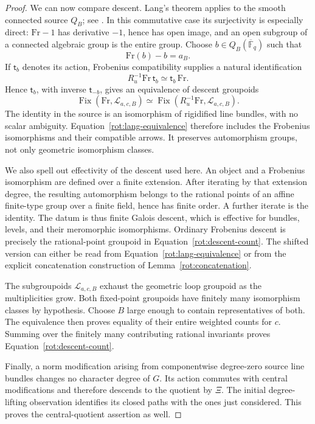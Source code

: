 \begin{proof}
We can now compare descent.  Lang's theorem applies to the smooth
connected source $Q_B$; see \cite[Theorem~1 and its corollary]{Lang}.  In this
commutative case its surjectivity is especially direct:
$\mathrm{Fr}-1$ has derivative $-1$, hence has open image, and an open
subgroup of a connected algebraic group is the entire group.  Choose
$b\in Q_B(\overline{\mathbb F}_q)$ such that
\[
 \mathrm{Fr}(b)-b=a_B.
\]
If $\mathsf t_b$ denotes its action, Frobenius compatibility supplies
a natural identification
\[
 R_u^{-1}\mathrm{Fr}\,\mathsf t_b
                    \simeq\mathsf t_b\,\mathrm{Fr}.
\]
Hence $\mathsf t_b$, with inverse $\mathsf t_{-b}$, gives an equivalence
of descent groupoids
\begin{equation}\label{rot:lang-equivalence}
 \operatorname{Fix}(\mathrm{Fr},\mathcal L_{a,c,B})
   \simeq
 \operatorname{Fix}(R_u^{-1}\mathrm{Fr},\mathcal L_{a,c,B}).
\end{equation}
The identity in the source is an isomorphism of rigidified line
bundles, with no scalar ambiguity.  Equation~\eqref{rot:lang-equivalence}
therefore includes the Frobenius isomorphisms and their compatible
arrows.  It preserves automorphism groups, not only geometric
isomorphism classes.

We also spell out effectivity of the descent used here.  An object and
a Frobenius isomorphism are defined over a finite extension.  After
iterating by that extension degree, the resulting automorphism belongs
to the rational points of an affine finite-type group over a finite
field, hence has finite order.  A further iterate is the identity.
The datum is thus finite Galois descent, which is effective for bundles,
levels, and their meromorphic isomorphisms.  Ordinary Frobenius descent
is precisely the rational-point groupoid in
Equation~\eqref{rot:descent-count}.  The shifted version can either be
read from Equation~\eqref{rot:lang-equivalence} or from the explicit
concatenation construction of Lemma~\ref{rot:concatenation}.

The subgroupoids $\mathcal L_{a,c,B}$ exhaust the geometric loop
groupoid as the multiplicities grow.  Both fixed-point groupoids have
finitely many isomorphism classes by hypothesis.  Choose $B$ large
enough to contain representatives of both.  The equivalence then
proves equality of their entire weighted counts for $c$.  Summing over
the finitely many contributing rational invariants proves
Equation~\eqref{rot:descent-count}.

Finally, a norm modification arising from componentwise degree-zero
source line bundles changes no character degree of $G$.  Its action
commutes with central modifications and therefore descends to the
quotient by $\Xi$.  The initial degree-lifting observation identifies
its closed paths with the ones just considered.  This proves the
central-quotient assertion as well.
\end{proof}

